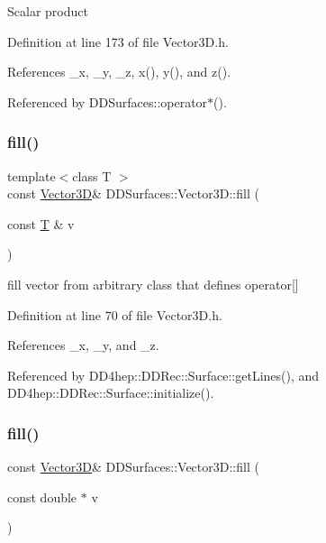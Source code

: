 Scalar product 

Definition at line 173 of file Vector3\+D.\+h.



References \+\_\+x, \+\_\+y, \+\_\+z, x(), y(), and z().



Referenced by D\+D\+Surfaces\+::operator$\ast$().

\hypertarget{class_d_d_surfaces_1_1_vector3_d_a978213de77a5f7770167ec87c6798e67}{}\label{class_d_d_surfaces_1_1_vector3_d_a978213de77a5f7770167ec87c6798e67} 
\subsubsection{\texorpdfstring{fill()}{fill()}\hspace{0.1cm}{\footnotesize\ttfamily [1/3]}}
{\footnotesize\ttfamily template$<$class T $>$ \\
const \hyperlink{class_d_d_surfaces_1_1_vector3_d}{Vector3D}\& D\+D\+Surfaces\+::\+Vector3\+D\+::fill (\begin{DoxyParamCaption}\item[{const \hyperlink{class_t}{T} \&}]{v }\end{DoxyParamCaption})\hspace{0.3cm}{\ttfamily [inline]}}



fill vector from arbitrary class that defines operator\mbox{[}\mbox{]} 



Definition at line 70 of file Vector3\+D.\+h.



References \+\_\+x, \+\_\+y, and \+\_\+z.



Referenced by D\+D4hep\+::\+D\+D\+Rec\+::\+Surface\+::get\+Lines(), and D\+D4hep\+::\+D\+D\+Rec\+::\+Surface\+::initialize().

\hypertarget{class_d_d_surfaces_1_1_vector3_d_a885f3dc7b3cfb7aea34c282b2ab01401}{}\label{class_d_d_surfaces_1_1_vector3_d_a885f3dc7b3cfb7aea34c282b2ab01401} 
\subsubsection{\texorpdfstring{fill()}{fill()}\hspace{0.1cm}{\footnotesize\ttfamily [2/3]}}
{\footnotesize\ttfamily const \hyperlink{class_d_d_surfaces_1_1_vector3_d}{Vector3D}\& D\+D\+Surfaces\+::\+Vector3\+D\+::fill (\begin{DoxyParamCaption}\item[{const double $\ast$}]{v }\end{DoxyParamCaption})\hspace{0.3cm}{\ttfamily [inline]}}



